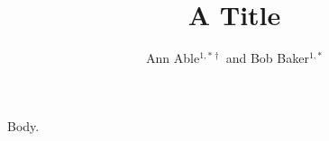 \documentclass{revtex4-2}
\begin{document}
\title{A Title}
\author{Ann Able$^{1,*\dagger}$ and Bob Baker$^{1,*}$}
\maketitle
Body.
\end{document}
